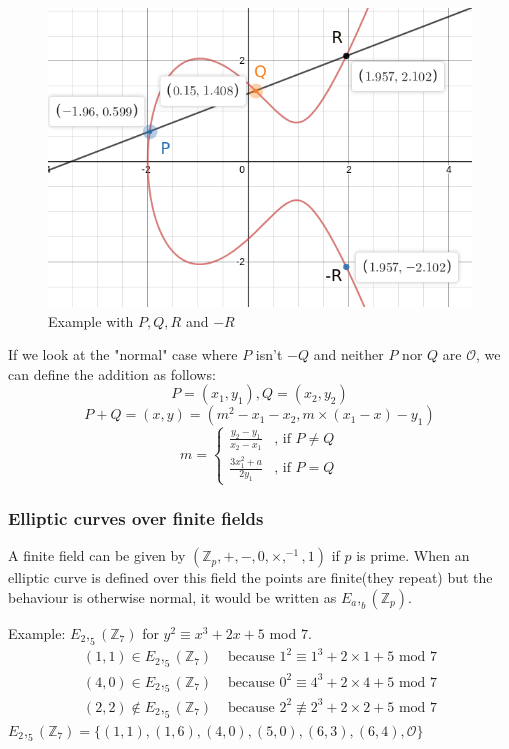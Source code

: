 \documentclass[a4paper,12pt]{scrartcl}
\begin{document}
\begin{figure}[hb!]
	\centering
	\includegraphics[width=0.5\linewidth]{ec2}
	\caption[]{Example with $P, Q, R$ and $-R$}
\end{figure}

If we look at the "normal" case where $P$ isn't $-Q$ and neither $P$ nor $Q$ are $\mathcal{O}$, we can define the addition as follows:
\[ P = (x_1,y_1), Q = (x_2,y_2) \]
\[ P + Q = (x,y) = (m^2 - x_1 -x_2, m \times (x_1 - x) - y_1) \]
\[ m =
\begin{cases}
\frac{y_2 - y_1}{x_2 - x_1}
& \text{, if } P \neq Q \\
\frac{3x_1^2 + a}{2y_1}
& \text{, if } P = Q
\end{cases}
\]

\subsubsection{Elliptic curves over finite fields}
A finite field can be given by $(\mathbb{Z}_p,+,-,0,\times,^{-1},1)$ if $p$ is prime. When an elliptic curve is defined over this field the points are finite(they repeat) but the behaviour is otherwise normal, it would be written as $E_a,_b (\mathbb{Z}_p)$.

Example: $E_2,_5 (\mathbb{Z}_7)$ for $y^2 \equiv x^3 + 2x + 5$ mod $7$.
\begin{align}
(1,1) \in E_2,_5 (\mathbb{Z}_7) & \text{ because } 1^2 \equiv 1^3 + 2\times{1} + 5 \text{ mod } 7 \\
(4,0) \in E_2,_5 (\mathbb{Z}_7) & \text{ because } 0^2 \equiv 4^3 + 2\times{4} + 5 \text{ mod } 7 \\
(2,2) \notin E_2,_5 (\mathbb{Z}_7) & \text{ because } 2^2 \not \equiv 2^3 + 2\times{2} + 5 \text{ mod } 7 
\end{align}
$E_2,_5 (\mathbb{Z}_7) = \{ (1,1),(1,6),(4,0),(5,0),(6,3),(6,4), \mathcal{O} \}$
\end{document}
